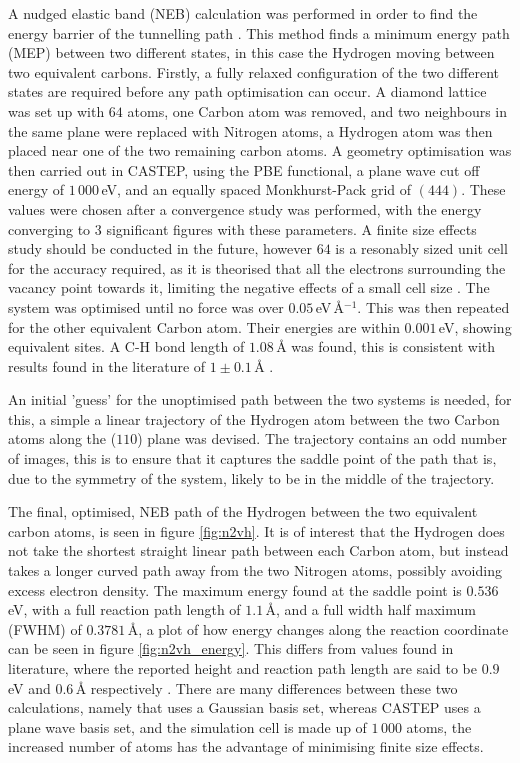 \documentclass[10pt,a4paper,twocolumn,twoside]{extarticle}
\begin{document}
A nudged elastic band (NEB) calculation was performed in order to find the energy barrier of the tunnelling path \cite{NEB}.
This method finds a minimum energy path (MEP) between two different states, in this case the Hydrogen moving between two equivalent carbons.
Firstly, a fully relaxed configuration of the two different states are required before any path optimisation can occur.
A diamond lattice was set up with $64$ atoms, one Carbon atom was removed, and two neighbours in the same plane were replaced with Nitrogen atoms, a Hydrogen atom was then placed near one of the two remaining carbon atoms. A geometry optimisation was then carried out in CASTEP, using the PBE functional, a plane wave cut off energy of $1\,000$\,eV, and an equally spaced Monkhurst-Pack grid of $(4 4 4)$. These values were chosen after a convergence study was performed, with the energy converging to 3 significant figures with these parameters. A finite size effects study should be conducted in the future, however $64$ is a resonably sized unit cell for the accuracy required, as it is theorised that all the electrons surrounding the vacancy point towards it, limiting the negative effects of a small cell size \cite{NVCage}. The system was optimised until no force was over $0.05$\,eV\,\AA$^{-1}$. This was then repeated for the other equivalent Carbon atom. Their energies are within $0.001$\,eV, showing equivalent sites. A C-H bond length of $1.08$\,{\AA} was found, this is consistent with results found in the literature of $1 \pm 0.1$\,{\AA} \cite{N2VH_CH_Bond}.

An initial 'guess' for the unoptimised path between the two systems is needed, for this, a simple a linear trajectory of the Hydrogen atom between the two Carbon atoms along the ($110$) plane was devised. The trajectory contains an odd number of images, this is to ensure that it captures the saddle point of the path that is, due to the symmetry of the system, likely to be in the middle of the trajectory. 

The final, optimised, NEB path of the Hydrogen between the two equivalent carbon atoms, is seen in figure \ref{fig:n2vh}. It is of interest that the Hydrogen does not take the shortest straight linear path between each Carbon atom, but instead takes a longer curved path away from the two Nitrogen atoms, possibly avoiding excess electron density. The maximum energy found at the saddle point is $0.536$\,eV, with a full reaction path length of $1.1$\,{\AA}, and a full width half maximum (FWHM) of $0.3781$\,{\AA}, a plot of how energy changes along the reaction coordinate can be seen in figure \ref{fig:n2vh_energy}. This differs from values found in literature, where the reported height and reaction path length are said to be $0.9$\,eV and $0.6$\,{\AA} respectively \cite{Peaker}. There are many differences between these two calculations, namely that \textcite{Peaker} uses a Gaussian basis set, whereas CASTEP uses a plane wave basis set, and the simulation cell is made up of $1\,000$ atoms, the increased number of atoms has the advantage of minimising finite size effects. 
\end{document}
